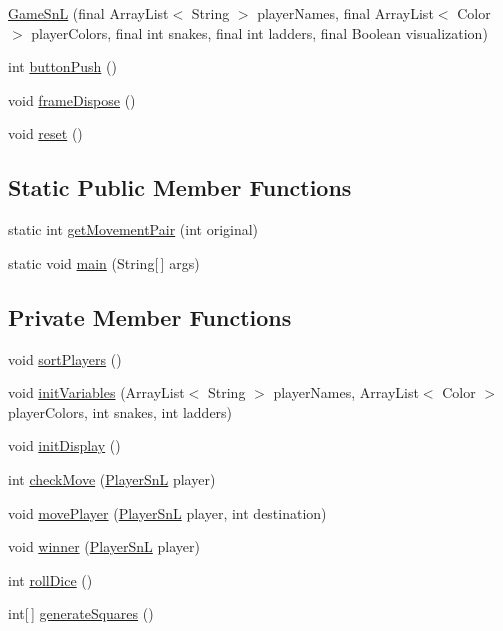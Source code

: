 \begin{DoxyCompactItemize}
\item 
\hyperlink{class_game_1_1_game_sn_l_a6fe06bf600d5c45331213809355c2dea}{Game\+Sn\+L} (final Array\+List$<$ String $>$ player\+Names, final Array\+List$<$ Color $>$ player\+Colors, final int snakes, final int ladders, final Boolean visualization)
\item 
int \hyperlink{class_game_1_1_game_sn_l_ae00564fcdb6a04cf947fbd9a3a540afc}{button\+Push} ()
\item 
void \hyperlink{class_game_1_1_game_sn_l_aef0c39ae2a4b0a54a2fa7f7a9037ac23}{frame\+Dispose} ()
\item 
void \hyperlink{class_game_1_1_game_sn_l_a144de1dde78fd74ce80cc83793414171}{reset} ()
\end{DoxyCompactItemize}
\subsection*{Static Public Member Functions}
\begin{DoxyCompactItemize}
\item 
static int \hyperlink{class_game_1_1_game_sn_l_adb89cd5405a48486385f71e283923f4e}{get\+Movement\+Pair} (int original)
\item 
static void \hyperlink{class_game_1_1_game_sn_l_ab20ec2d01e628a96bbf74c98d2c471b1}{main} (String\mbox{[}$\,$\mbox{]} args)
\end{DoxyCompactItemize}
\subsection*{Private Member Functions}
\begin{DoxyCompactItemize}
\item 
void \hyperlink{class_game_1_1_game_sn_l_a9ea5d21ac9e477612c96de2ffa25fce3}{sort\+Players} ()
\item 
void \hyperlink{class_game_1_1_game_sn_l_a95f5e6f89379d65d08bf6421b07b202b}{init\+Variables} (Array\+List$<$ String $>$ player\+Names, Array\+List$<$ Color $>$ player\+Colors, int snakes, int ladders)
\item 
void \hyperlink{class_game_1_1_game_sn_l_ae3a0f31e079a3eb474a5e0a90ebf5a50}{init\+Display} ()
\item 
int \hyperlink{class_game_1_1_game_sn_l_a0b8ab49d329624503e5ca5dd85cb64c3}{check\+Move} (\hyperlink{class_player_1_1_player_sn_l}{Player\+Sn\+L} player)
\item 
void \hyperlink{class_game_1_1_game_sn_l_a9a88724dc4d30ef554e1024facc396ee}{move\+Player} (\hyperlink{class_player_1_1_player_sn_l}{Player\+Sn\+L} player, int destination)
\item 
void \hyperlink{class_game_1_1_game_sn_l_ad27ea3509697a5154650136b9b8a6ad6}{winner} (\hyperlink{class_player_1_1_player_sn_l}{Player\+Sn\+L} player)
\item 
int \hyperlink{class_game_1_1_game_sn_l_a2014a57bc83dedaff97c1dbc1a7ff558}{roll\+Dice} ()
\item 
int\mbox{[}$\,$\mbox{]} \hyperlink{class_game_1_1_game_sn_l_a7e7927cbebfd31c8bb0204edc40adffc}{generate\+Squares} ()
\end{DoxyCompactItemize}
